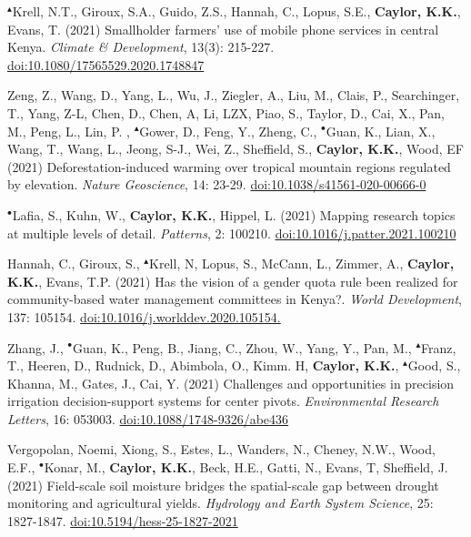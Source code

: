 \begin{etaremune}
\item $^{\blacktriangle}$Krell, N.T., Giroux, S.A., Guido, Z.S., Hannah, C., Lopus, S.E., \textbf{ Caylor, K.K.}, Evans, T. (2021) Smallholder farmers' use of mobile phone services in central Kenya. \emph{Climate \& Development}, 13(3): 215-227. \href{https://doi.org/10.1080/17565529.2020.1748847}{doi:10.1080/17565529.2020.1748847}
\item Zeng, Z., Wang, D., Yang, L., Wu, J., Ziegler, A., Liu, M., Clais, P., Searchinger, T., Yang, Z-L, Chen, D., Chen, A, Li, LZX, Piao, S., Taylor, D., Cai, X., Pan, M., Peng, L., Lin, P. , $^{\blacktriangle}$Gower, D., Feng, Y., Zheng, C., $^{\bullet}$Guan, K., Lian, X., Wang, T., Wang, L., Jeong, S-J., Wei, Z., Sheffield, S., \textbf{ Caylor, K.K.}, Wood, EF (2021) Deforestation-induced warming over tropical mountain regions regulated by elevation. \emph{Nature Geoscience}, 14: 23-29. \href{https://doi.org/10.1038/s41561-020-00666-0}{doi:10.1038/s41561-020-00666-0}
\item $^{\bullet}$Lafia, S., Kuhn, W., \textbf{ Caylor, K.K.}, Hippel, L. (2021) Mapping research topics at multiple levels of detail. \emph{Patterns}, 2: 100210. \href{https://doi.org/10.1016/j.patter.2021.100210}{doi:10.1016/j.patter.2021.100210}
\item Hannah, C., Giroux, S., $^{\blacktriangle}$Krell, N, Lopus, S., McCann, L., Zimmer, A., \textbf{ Caylor, K.K.}, Evans, T.P. (2021) Has the vision of a gender quota rule been realized for community-based water management committees in Kenya?. \emph{World Development}, 137: 105154. \href{https://doi.org/10.1016/j.worlddev.2020.105154.}{doi:10.1016/j.worlddev.2020.105154.}
\item Zhang, J., $^{\bullet}$Guan, K., Peng, B., Jiang, C., Zhou, W., Yang, Y., Pan, M., $^{\blacktriangle}$Franz, T., Heeren, D., Rudnick, D., Abimbola, O., Kimm. H, \textbf{ Caylor, K.K.}, $^{\blacktriangle}$Good, S., Khanna, M., Gates, J., Cai, Y. (2021) Challenges and opportunities in precision irrigation decision-support systems for center pivots. \emph{Environmental Research Letters}, 16: 053003. \href{https://doi.org/10.1088/1748-9326/abe436 }{doi:10.1088/1748-9326/abe436}
\item Vergopolan, Noemi, Xiong, S., Estes, L., Wanders, N., Cheney, N.W., Wood, E.F., $^{\bullet}$Konar, M., \textbf{ Caylor, K.K.}, Beck, H.E., Gatti, N., Evans, T, Sheffield, J. (2021) Field-scale soil moisture bridges the spatial-scale gap between drought monitoring and agricultural yields. \emph{Hydrology and Earth System Science}, 25: 1827-1847. \href{https://doi.org/10.5194/hess-25-1827-2021}{doi:10.5194/hess-25-1827-2021}

\end{etaremune}
